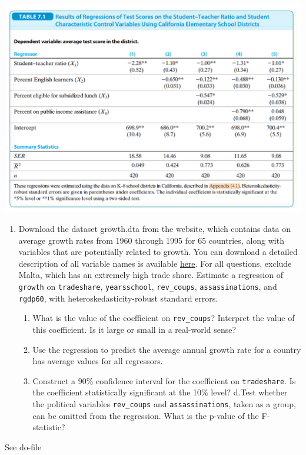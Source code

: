 \documentclass[
]{article}
\providecommand{\tightlist}{%
  \setlength{\itemsep}{0pt}\setlength{\parskip}{0pt}}
\begin{document}
\centering\includegraphics[scale=0.5]{materials/sw7-1.png}

\begin{enumerate}
\def\labelenumi{\arabic{enumi}.}
\setcounter{enumi}{5}
\tightlist
\item
  Download the dataset {growth.dta} from the website, which
  contains data on average growth rates from 1960 through 1995 for 65
  countries, along with variables that are potentially related to
  growth. You can download a detailed description of all variable names
  is available
  \href{https://www.princeton.edu/~mwatson/Stock-Watson_3u/Students/EE_Datasets/Growth_Description.pdf}{here}.
  For all questions, exclude Malta, which has an extremely high trade
  share. Estimate a regression of \texttt{growth} on
  \texttt{tradeshare}, \texttt{yearsschool}, \texttt{rev\_coups},
  \texttt{assassinations}, and \texttt{rgdp60}, with
  heteroskedasticity-robust standard errors.

  \begin{enumerate}
  \def\labelenumii{\alph{enumii}.}
  \tightlist
  \item
    What is the value of the coefficient on \texttt{rev\_coups}?
    Interpret the value of this coefficient. Is it large or small in a
    real-world sense?
    
  \item
    Use the regression to predict the average annual growth rate for a
    country has average values for all regressors.
  \item
    Construct a 90\% confidence interval for the coefficient on
    \texttt{tradeshare}. Is the coefficient statistically significant at
    the 10\% level? d.Test whether the political variables
    \texttt{rev\_coups} and \texttt{assassinations}, taken as a group,
    can be omitted from the regression. What is the p-value of the
    F-statistic?
  \end{enumerate}
\end{enumerate}

{\color{red} See do-file}
\end{document}
